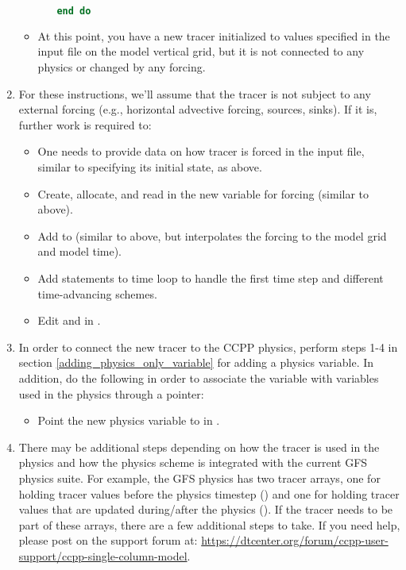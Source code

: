 \begin{enumerate}
\begin{itemize}
\begin{itemize}
\begin{lstlisting}[language = Fortran]
		end do
		\end{lstlisting}
		\end{itemize}
	\item At this point, you have a new tracer initialized to values specified in the input file on the model vertical grid, but it is not connected to any physics or changed by any forcing.
	\end{itemize}
\item For these instructions, we'll assume that the tracer is not subject to any external forcing (e.g., horizontal advective forcing, sources, sinks). If it is, further work is required to:
	\begin{itemize}
	\item One needs to provide data on how tracer is forced in the input file, similar to specifying its initial state, as above.
	\item Create, allocate, and read in the new variable for forcing (similar to above).
	\item Add to  (similar to above, but interpolates the forcing to the model grid and model time).
	\item Add statements to time loop to handle the first time step and different time-advancing schemes.
	\item Edit  and  in .
	\end{itemize}
\item In order to connect the new tracer to the CCPP physics, perform steps 1-4 in section \ref{adding_physics_only_variable} for adding a physics variable. In addition, do the following in order to associate the  variable with variables used in the physics through a pointer:
	\begin{itemize}
	\item Point the new physics variable to  in .
	\end{itemize}
\item There may be additional steps depending on how the tracer is used in the physics and how the physics scheme is integrated with the current GFS physics suite. For example, the GFS physics has two tracer arrays, one for holding tracer values before the physics timestep () and one for holding tracer values that are updated during/after the physics (). If the tracer needs to be part of these arrays, there are a few additional steps to take. If you need help, please post on the support forum at: \url{https://dtcenter.org/forum/ccpp-user-support/ccpp-single-column-model}.
\end{enumerate}
